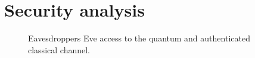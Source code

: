\section{Security analysis}


\begin{figure}[htb]
	\centering
	
	\caption{Eavesdroppers Eve access to the quantum and authenticated classical channel.}
\end{figure}
